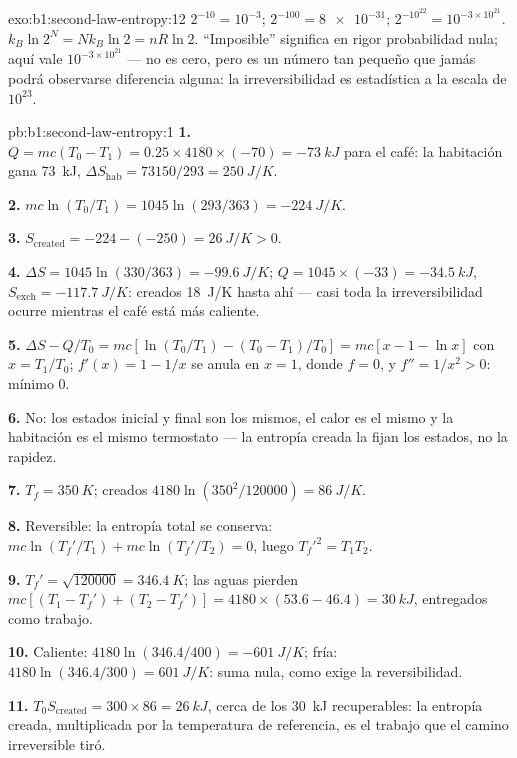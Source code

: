 \begin{solution}{exo:b1:second-law-entropy:12}
$2^{-10} = 10^{-3}$; $2^{-100} = \num{8e-31}$; $2^{-10^{22}} = 10^{-3\times10^{21}}$.
$k_B\ln2^N = Nk_B\ln2 = nR\ln2$. ``Imposible'' significa en rigor
probabilidad nula; aquí vale $10^{-3\times10^{21}}$ --- no es cero, pero es un número tan pequeño
que jamás podrá observarse diferencia alguna: la irreversibilidad es
estadística a la escala de $10^{23}$.
\end{solution}

\begin{solution}{pb:b1:second-law-entropy:1}
\textbf{1.} $Q = mc(T_0 - T_1) = 0.25 \times 4180 \times (-70) = \qty{-73}{kJ}$
para el café: la habitación gana \qty{73}{kJ}, $\Delta S_{\text{hab}} = 73150/293
= \qty{+250}{J/K}$.

\textbf{2.} $mc\ln(T_0/T_1) = 1045\ln(293/363) = \qty{-224}{J/K}$.

\textbf{3.} $S_{\mathrm{created}} = -224 - (-250) = \qty{+26}{J/K} > 0$.

\textbf{4.} $\Delta S = 1045\ln(330/363) = \qty{-99.6}{J/K}$; $Q = 1045 \times
(-33) = \qty{-34.5}{kJ}$, $S_{\mathrm{exch}} = \qty{-117.7}{J/K}$: creados
\qty{18}{J/K} hasta ahí --- casi toda la irreversibilidad ocurre mientras el
café está más caliente.

\textbf{5.} $\Delta S - Q/T_0 = mc[\ln(T_0/T_1) - (T_0 - T_1)/T_0] = mc[x - 1 -
\ln x]$ con $x = T_1/T_0$; $f'(x) = 1 - 1/x$ se anula en $x = 1$, donde
$f = 0$, y $f'' = 1/x^2 > 0$: mínimo $0$.

\textbf{6.} No: los estados inicial y final son los mismos, el calor es el
mismo y la habitación es el mismo termostato --- la entropía creada la
fijan los estados, no la rapidez.

\textbf{7.} $T_f = \qty{350}{K}$; creados $4180\ln(350^2/120000) = \qty{86}{J/K}$.

\textbf{8.} Reversible: la entropía total se conserva: $mc\ln(T_f'/T_1) + mc\ln(T_f'/
T_2) = 0$, luego $T_f'^2 = T_1T_2$.

\textbf{9.} $T_f' = \sqrt{120000} = \qty{346.4}{K}$; las aguas pierden $mc[(T_1 -
T_f') + (T_2 - T_f')] = 4180 \times (53.6 - 46.4) = \qty{30}{kJ}$, entregados como
trabajo.

\textbf{10.} Caliente: $4180\ln(346.4/400) = \qty{-601}{J/K}$; fría: $4180\ln(346.4/
300) = \qty{+601}{J/K}$: suma nula, como exige la reversibilidad.

\textbf{11.} $T_0S_{\mathrm{created}} = 300 \times 86 = \qty{26}{kJ}$, cerca de los
\qty{30}{kJ} recuperables: la entropía creada, multiplicada por la
temperatura de referencia, es el trabajo que el camino irreversible tiró.


\end{solution}
